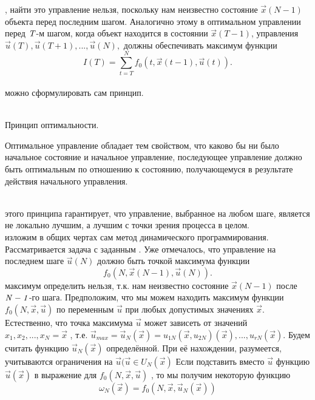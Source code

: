 , найти это управление нельзя, поскольку нам неизвестно состояние $\vec{x}(N-1)$ объекта перед последним шагом. Аналогично этому в оптимальном управлении перед  $\it T$-м шагом, когда объект находится в состоянии $\vec{x}(T-1)$, управления $\vec{u}(T), \vec{u}(T+1),...,\vec{u}(N),$ должны обеспечивать максимум функции
\begin{equation}\label{equation_7_12}
I(T)=\sum_{t=T}^N f_0(t,\vec{x}(t-1), \vec{u}(t)).
\end{equation}\\
 можно сформулировать сам принцип.\\\\
\indent\begin{bfseries}Принцип оптимальности.\end{bfseries} \begin{it}Оптимальное управление обладает тем свойством, что каково бы ни было начальное состояние и начальное управление, последующее управление должно быть оптимальным по отношению к состоянию, получающемуся в результате действия начального управления.\end{it}\\ этого принципа гарантирует, что управление, выбранное на любом шаге, является не локально лучшим, а лучшим с точки зрения  процесса в целом. \\
 изложим в общих чертах сам метод динамического программирования. Рассматривается задача с заданным  . Уже
отмечалось, что управление на последнем шаге $\vec{u}(N)$ должно быть точкой максимума функции
\begin{equation*}
f_0(N,\vec{x}(N-1),\vec{u}(N)).
\end{equation*}
 максимум определить нельзя, т.к. нам неизвестно состояние $\vec{x}(N-1)$  после $\it N-1$-го шага. Предположим, что мы можем находить максимум функции $f_0(N,\vec{x},\vec{u})$  по переменным $\vec{u}$ при любых допустимых значениях $\vec{x}$. Естественно, что точка максимума $\vec{u}$ может зависеть от значений ${x_1,x_2,...,x_N}=\vec{x}$ , т.е. $\vec{u}_{max}=\vec{u}_N(\vec{x}) = {u_{1N}(\vec{x}, u_{2N})(\vec{x}),...,u_{rN}(\vec{x})}$. Будем считать функцию $\vec{u}_{N}(\vec{x})$ определённой. При её нахождении, разумеется, учитываются ограничения на $\vec{u}(\vec{u} \in U_N(\vec{x})$  Если подставить вместо $\vec{u}$ функцию $\vec{u}(\vec{x})$ в выражение для $f_0(N,\vec{x},\vec{u})$ , то мы получим некоторую функцию \begin{equation*}
\omega_N (\vec{x})=f_0(N,\vec{x},\vec{u}_N(\vec{x}))
\end{equation*}
